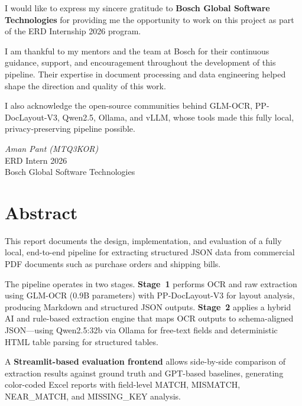 \documentclass[12pt,a4paper]{report}
\begin{document}
I would like to express my sincere gratitude to \textbf{Bosch Global Software Technologies} for providing me the opportunity to work on this project as part of the ERD Internship 2026 program.

I am thankful to my mentors and the team at Bosch for their continuous guidance, support, and encouragement throughout the development of this pipeline. Their expertise in document processing and data engineering helped shape the direction and quality of this work.

I also acknowledge the open-source communities behind GLM-OCR, PP-DocLayout-V3, Qwen2.5, Ollama, and vLLM, whose tools made this fully local, privacy-preserving pipeline possible.

\vspace{1cm}
\begin{flushright}
\textit{Aman Pant (MTQ3KOR)}\\
ERD Intern 2026\\
Bosch Global Software Technologies
\end{flushright}

\newpage
{
\sffamily
\setlength{\cftbeforesecskip}{1.5pt}
\setlength{\cftbeforesubsecskip}{0.5pt}
\setlength{\cftbeforechapskip}{5pt}
\tableofcontents
}
\newpage

\chapter{Abstract}

This report documents the design, implementation, and evaluation of a fully local, end-to-end pipeline for extracting structured JSON data from commercial PDF documents such as purchase orders and shipping bills.

The pipeline operates in two stages. \textbf{Stage~1} performs OCR and raw extraction using GLM-OCR (0.9B parameters) with PP-DocLayout-V3 for layout analysis, producing Markdown and structured JSON outputs. \textbf{Stage~2} applies a hybrid AI and rule-based extraction engine that maps OCR outputs to schema-aligned JSON---using Qwen2.5:32b via Ollama for free-text fields and deterministic HTML table parsing for structured tables.

A \textbf{Streamlit-based evaluation frontend} allows side-by-side comparison of extraction results against ground truth and GPT-based baselines, generating color-coded Excel reports with field-level MATCH, MISMATCH, NEAR\_MATCH, and MISSING\_KEY analysis.
\end{document}
